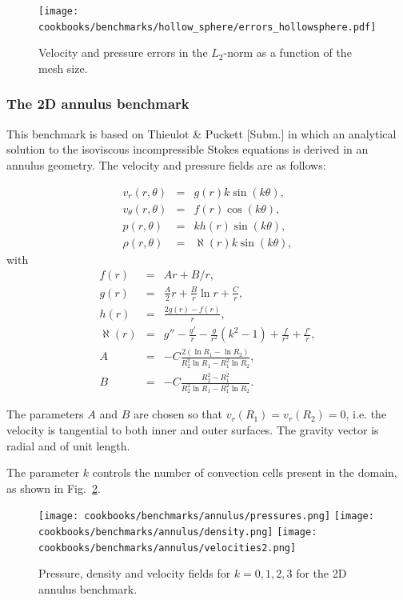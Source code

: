 \documentclass{article}
\begin{document}
\begin{figure}
\centering
\texttt{[image: cookbooks/benchmarks/hollow\_sphere/errors\_hollowsphere.pdf]}
\caption{Velocity and pressure errors in the $L_2$-norm as a function of the mesh size.}
\label{fig:hollow-sphere-errors}
\end{figure}


\subsubsection{The 2D annulus benchmark}
\label{sec:cookbooks-annulus}

This benchmark is based on Thieulot \& Puckett [Subm.] in which an analytical solution to the
isoviscous incompressible Stokes equations is derived in an annulus geometry.
The velocity and pressure fields are as follows:

\begin{eqnarray}
v_r(r,\theta)     &=&  g(r) k \sin(k\theta), \\
v_\theta(r,\theta)&=&  f(r) \cos(k \theta), \\ 
p(r,\theta)       &=&  k h(r) \sin(k \theta), \\
\rho (r,\theta)   &=& \aleph(r) k \sin (k \theta), 
\end{eqnarray}
with
\begin{eqnarray}
f(r)&=&Ar+B/r, \\
g(r) &=& \frac{A}{2}r  +  \frac{B}{r} \ln r + \frac{C}{r}, \\
h(r)&=& \frac{2g(r)-f(r)}{r},  \\
\aleph(r) &=& g'' - \frac{g'}{r}  - \frac{g}{r^2} (k^2 - 1)  + \frac{f}{r^2}   + \frac{f'}{r}, \\
A &=& -C\frac{2(\ln R_1 - \ln R_2)} { R_2^2 \ln R_1  - R_1^2 \ln R_2}, \\
B &=& -C \frac{R_2^2-R_1^2}{R_2^2 \ln R_1 - R_1^2 \ln R_2}.
\end{eqnarray}

The parameters $A$ and $B$ are chosen so that $v_r(R_1)=v_r(R_2)=0$, i.e.
the velocity is tangential to both inner and outer surfaces.
The gravity vector is radial and of unit length.

The parameter $k$ controls the number of convection cells present in the domain,
as shown in Fig.~\ref{fig:annulus-vp}.

\begin{figure}
\centering
\texttt{[image: cookbooks/benchmarks/annulus/pressures.png]}
\texttt{[image: cookbooks/benchmarks/annulus/density.png]}
\texttt{[image: cookbooks/benchmarks/annulus/velocities2.png]}
\caption{Pressure, density and velocity fields for $k=0,1,2,3$ for the 2D annulus benchmark.}
\label{fig:annulus-vp}
\end{figure}
\end{document}

